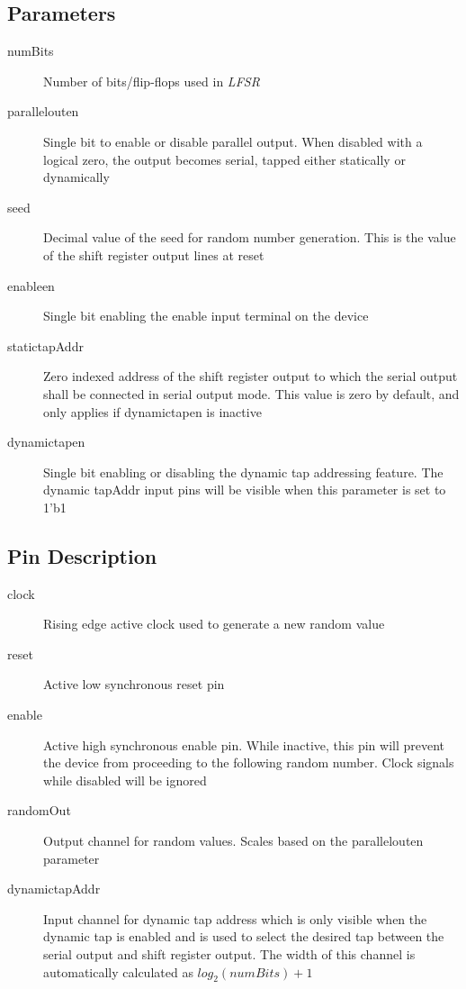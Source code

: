 \documentclass[11pt]{article}
\begin{document}
\subsection{Parameters}
\begin{description}
	\item[numBits]Number of bits/flip-flops used in \textit{LFSR}
	\item[parallel\textunderscore out\textunderscore en]Single bit to enable or disable parallel output. When disabled with a logical zero, the output
		becomes serial, tapped either statically or dynamically
	\item[seed]Decimal value of the seed for random number generation. This is the value of the shift register output lines at reset
	\item[enable\textunderscore en]Single bit enabling the enable input terminal on the device
	\item[static\textunderscore tapAddr]Zero indexed address of the shift register output to which the serial output shall be connected in serial output
		mode. This value is zero by default, and only applies if dynamic\textunderscore tap\textunderscore en is inactive
	\item[dynamic\textunderscore tap\textunderscore en]Single bit enabling or disabling the dynamic tap addressing feature. The dynamic\textunderscore
		tapAddr input pins will be visible when this parameter is set to 1'b1
\end{description}
\subsection{Pin Description}
\begin{description}
	\item[clock]Rising edge active clock used to generate a new random value
	\item[reset]Active low synchronous reset pin
	\item[enable]Active high synchronous enable pin. While inactive, this pin will prevent the device from proceeding to the following random number.
		Clock signals while disabled will be ignored
	\item[randomOut]Output channel for random values. Scales based on the parallel\textunderscore out\textunderscore en parameter
	\item[dynamic\textunderscore tapAddr]Input channel for dynamic tap address which is only visible when the dynamic tap is enabled and is used to select
		the desired tap between the serial output and shift register output. The width of this channel is automatically calculated as $log_2(numBits)+1$
\end{description}
\end{document}
